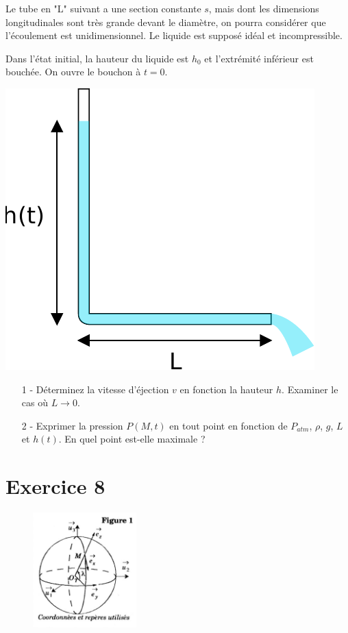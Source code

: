 \documentclass{report}
\begin{document}
Le tube en "L" suivant a une section constante $s$, mais dont les dimensions longitudinales sont très grande devant le diamètre, on pourra considérer que l'écoulement est unidimensionnel. Le liquide est supposé idéal et incompressible.

Dans l'état initial, la hauteur du liquide est $h_0$ et l'extrémité inférieur est bouchée. On ouvre le bouchon à $t=0$.

\begin{center}
	\includegraphics[scale=0.5]{meca_flu4.pdf}
\end{center}

\begin{itemize}

\item[1 - ] Déterminez la vitesse d'éjection $v$ en fonction la hauteur $h$. Examiner le cas où $L\longrightarrow0$.

\item[2 - ] Exprimer la pression $P(M,t)$ en tout point en fonction de $P_{atm}$, $\rho$, $g$, $L$ et $h(t)$. En quel point est-elle maximale ?

\end{itemize}

\newpage

\section*{Exercice 8}

\begin{figure}
\includegraphics[width=4cm]{meca_flu5.png}
\end{figure}
\end{document}
